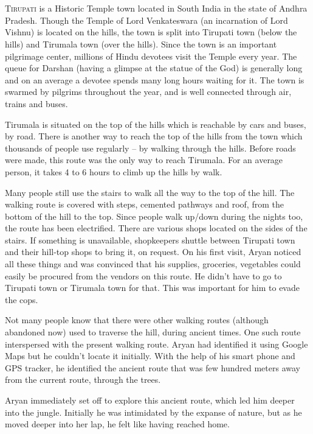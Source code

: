 \chapter{}

\lettrine{T}{irupati} is a Historic Temple town located in South India in the state of Andhra
Pradesh. Though the Temple of Lord Venkateswara (an incarnation of Lord Vishnu)
is located on the hills, the town is split into Tirupati town (below the hills)
and Tirumala town (over the hills). Since the town is an important pilgrimage
center, millions of Hindu devotees visit the Temple every year. The queue for
Darshan (having a glimpse at the statue of the God) is generally long and on an
average a devotee spends many long hours waiting for it. The town is swarmed by
pilgrims throughout the year, and is well connected through air, trains and
buses.

Tirumala is situated on the top of the hills which is reachable by cars and
buses, by road. There is another way to reach the top of the hills from the town
which thousands of people use regularly – by walking through the hills. Before
roads were made, this route was the only way to reach Tirumala. For an average
person, it takes 4 to 6 hours to climb up the hills by walk.

Many people still use the stairs to walk all the way to the top of the hill. The
walking route is covered with steps, cemented pathways and roof, from the bottom
of the hill to the top. Since people walk up/down during the nights too, the
route has been electrified. There are various shops located on the sides of the
stairs. If something is unavailable, shopkeepers shuttle between Tirupati town
and their hill-top shops to bring it, on request. On his first visit, Aryan
noticed all these things and was convinced that his supplies, groceries,
vegetables could easily be procured from the vendors on this route. He didn't
have to go to Tirupati town or Tirumala town for that. This was important for
him to evade the cops.

Not many people know that there were other walking routes (although abandoned
now) used to traverse the hill, during ancient times. One such route
interspersed with the present walking route. Aryan had identified it using
Google Maps but he couldn't locate it initially. With the help of his smart
phone and GPS tracker, he identified the ancient route that was few hundred
meters away from the current route, through the trees.

Aryan immediately set off to explore this ancient route, which led him deeper
into the jungle. Initially he was intimidated by the expanse of nature, but as
he moved deeper into her lap, he felt like having reached home.

